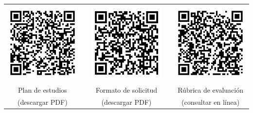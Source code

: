 \documentclass[a0]{sciposter}
\begin{document}
\quad

\begin{center}
\begin{tabular}{ccccc}
\quad & & \quad & & \quad \\
  
\includegraphics[width=80mm]{plan.png}
& &
\includegraphics[width=80mm]{solicitud.png}
& &
\includegraphics[width=80mm]{rubrica.png} \\

\quad & & \quad & & \quad \\
  
Plan de estudios & \quad\quad\quad &  Formato de solicitud & \quad\quad\quad & Rúbrica de evaluación \\
(descargar PDF) & & (descargar PDF) & & (consultar en línea) 


\end{tabular}
\end{center}
\end{document}
